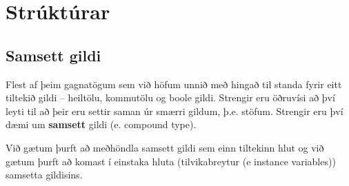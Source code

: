 





\chapter{Strúktúrar}
\label{structs}

\section{Samsett gildi}

Flest af þeim gagnatögum sem við höfum unnið með hingað til standa fyrir eitt tiltekið
gildi -- heiltölu, kommutölu og boole gildi.
Strengir eru öðruvísi að því leyti til að þeir eru settir saman úr smærri gildum, þ.e. stöfum.
Strengir eru því dæmi um {\bf samsett} gildi (e. compound type).

Við gætum þurft að meðhöndla samsett gildi sem einn tiltekinn hlut og við gætum þurft að komast í einstaka hluta (tilvikabreytur (e instance variables)) samsetta gildisins.

